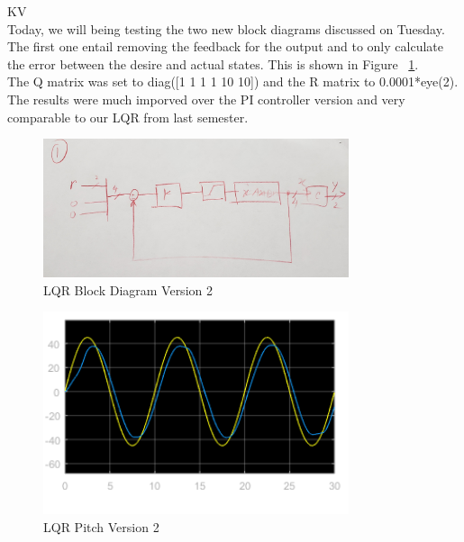 \documentclass[fontsize=11pt, %
                             paper=letter, %
                             openany, %
                             captions=tableheading,
                             index=totoc,
                             hyperref]{labbook}
\begin{document}
\begin{addmargin}[0cm]{0cm}
KV\\
Today, we will being testing the two new block diagrams discussed on Tuesday.  The first one entail removing the feedback for the output and to only calculate the error between the desire and actual states.  This is shown in Figure ~\ref{fig:LQR_V2}.
\\The Q matrix was set to diag([1 1 1 1 10 10]) and the R matrix to 0.0001*eye(2).
\\The results were much imporved over the PI controller version and very comparable to our LQR from last semester.

\begin{figure}[H]
  \centering
  \includegraphics[width=0.8\textwidth]{figs/img/02212019/LQRV2.jpg}
  \caption{LQR Block Diagram Version 2}
  \label{fig:LQR_V2}
\end{figure}

\begin{figure}[H]
  \centering
  \includegraphics[width=0.8\textwidth]{figs/img/02212019/LQR_PitchV2.png}
  \caption{LQR Pitch Version 2}
  \label{fig:LQR_PitchV2}
\end{figure}


\end{addmargin}
\end{document}
